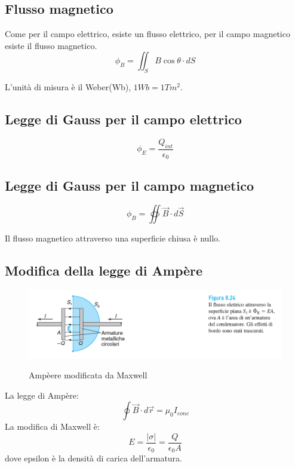 \subsection{Flusso magnetico}
Come per il campo elettrico, esiste un flusso elettrico, per il campo 
magnetico esiste il flusso magnetico.
\begin{equation}
    \phi_B = \iint_S{B\cos\theta \cdot dS}
\end{equation}

L'unità di misura è il Weber(Wb), $1Wb = 1Tm^{2}$.


\subsection{Legge di Gauss per il campo elettrico}
\begin{equation*}
    \phi_E = \frac{Q_{int}}{\epsilon_0}
\end{equation*}

\subsection{Legge di Gauss per il campo magnetico}
\begin{equation*}
    \phi_B = \oiint{\vec{B}\cdot d\vec{S}}
\end{equation*}

Il flusso magnetico attraverso una superficie chiusa è nullo.


\subsection{Modifica della legge di Ampère}

\begin{figure}[H]
    \centering
    \includegraphics[width=0.8\linewidth]{imgs/16 - ampere modificata da maxwell.png}
    \label{fig:ampere_modificata}
    \caption{Ampèere modificata da Maxwell}
\end{figure}

La legge di Ampère:
\begin{equation*}
    \oint{\vec{B}\cdot d\vec{r}} = \mu_0I_{conc}
\end{equation*}
La modifica di Maxwell è:
\begin{equation}
    E = \frac{|\sigma|}{\epsilon_0} = \frac{Q}{\epsilon_0A}
\end{equation}
dove epsilon è la densità di carica dell'armatura.


